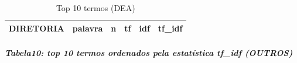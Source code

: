 \documentclass[]{article}
\newenvironment{Shaded}{\begin{snugshade}}{\end{snugshade}}
\newcommand{\DataTypeTok}[1]{\textcolor[rgb]{0.13,0.29,0.53}{#1}}
\newcommand{\DecValTok}[1]{\textcolor[rgb]{0.00,0.00,0.81}{#1}}
\newcommand{\KeywordTok}[1]{\textcolor[rgb]{0.13,0.29,0.53}{\textbf{#1}}}
\newcommand{\NormalTok}[1]{#1}
\newcommand{\OperatorTok}[1]{\textcolor[rgb]{0.81,0.36,0.00}{\textbf{#1}}}
\newcommand{\StringTok}[1]{\textcolor[rgb]{0.31,0.60,0.02}{#1}}
\let\oldsubparagraph\subparagraph
\renewcommand{\subparagraph}[1]{\oldsubparagraph{#1}\mbox{}}
\begin{document}
\begin{table}[!h]

\caption{\label{tab:unnamed-chunk-45}Top 10 termos (DEA)}
\centering
\begin{tabular}{llrrrr}
\toprule
\rowcolor{gray!6}  DIRETORIA & palavra & n & tf & idf & tf\_idf\\


\bottomrule
\end{tabular}
\end{table}

\hypertarget{tabela10-top-10-termos-ordenados-pela-estatistica-tf_idf-outros}{%
\subparagraph{\texorpdfstring{Tabela10: top 10 termos ordenados pela
estatística \textbf{tf\_idf}
(OUTROS)}{Tabela10: top 10 termos ordenados pela estatística tf\_idf (OUTROS)}}\label{tabela10-top-10-termos-ordenados-pela-estatistica-tf_idf-outros}}

\begin{Shaded}
\end{Shaded}
\end{document}
